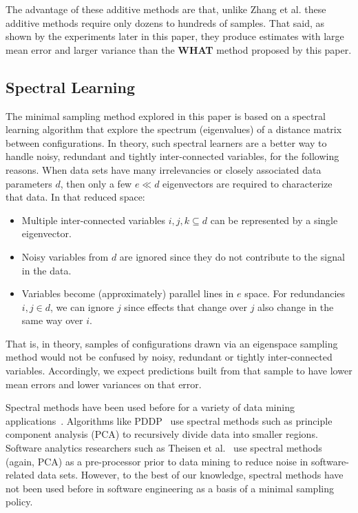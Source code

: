 \documentclass{sig-alternative}
\newcommand{\bi}{\begin{itemize}}%
\newcommand{\ei}{\end{itemize}}
\newcommand{\what}{{\bf WHAT }}
\begin{document}
The advantage of these additive methods are that, unlike  Zhang et al. these additive methods require only dozens to hundreds of samples. That said, as shown by the experiments later in this
paper, they produce estimates with large mean error and larger variance than the \what method proposed by
this paper.
 

\subsection{Spectral Learning}\label{sect:spect}

The minimal sampling method explored in this paper is based on a spectral learning algorithm
that  explore the spectrum (eigenvalues) of a distance matrix between  configurations.
In theory, such spectral learners are a better way to handle noisy, redundant and tightly inter-connected variables, for the following reasons.
When data sets have many irrelevancies   or closely associated data parameters $d$, then
only a few $e \ll d$ eigenvectors are required to characterize that data.
In that reduced space:
\bi
\item
Multiple inter-connected variables $i,j,k \subseteq d$ can be represented
by a single eigenvector.
\item
Noisy variables from $d$ are
ignored since they  do not contribute to the signal in the data.
\item
Variables  become (approximately) parallel lines
in $e$ space. For  redundancies \mbox{$i,j \in d$}, we
can ignore $j$
since effects that change over $j$ also
change in the same way over $i$.
\ei
That is, in theory, samples of configurations drawn via an eigenspace sampling method
would not be confused by noisy, redundant or tightly inter-connected variables. Accordingly,
we expect predictions built from that sample to have  lower mean errors and lower variances on that error.

Spectral methods have been used before for a variety of data mining applications~\cite{kamvar2003spectral}.
Algorithms like PDDP~\cite{boley98} use spectral methods such as principle component analysis (PCA) to
recursively divide data into smaller regions.  Software analytics researchers such as Theisen et al.~\cite{Theisen15}  use spectral methods (again, PCA) as a pre-processor prior to data mining  to reduce noise in software-related data sets.
However, to the best of our knowledge, spectral methods have not been used before in software engineering as a basis 
of a minimal sampling policy.
\end{document}
